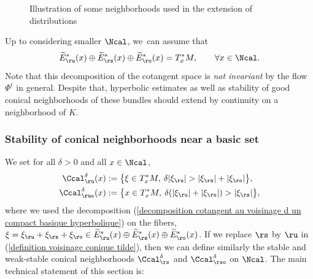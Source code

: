 \begin{figure}[t]
\centering
\def\svgscale{0.5}

\caption{Illustration of some neighborhoods used in the extension of distributions}
\label{fig: neighborhoods extension of distributions}
\end{figure}

Up to considering smaller $\Ncal$, we~can assume that
\begin{equation}\label{decomposition cotangent au voisinage d un compact basique hyperbolique}
\widetilde{E}_{\ru}^*(x) \oplus \widetilde{E}_{\rs}^*(x) \oplus \widetilde{E}_\ro^*(x) = T_x^* M, \qquad \forall x \in \Ncal.
\end{equation}
Note that this decomposition of the cotangent space is \emph{not invariant} by the flow~$\Phi^t$ in general. Despite that, hyperbolic estimates as well as stability of good conical neighborhoods of these bundles should extend by continuity on a neighborhood of $K$.

\subsubsection{Stability of conical neighborhoods near a basic set}

We set for all $\delta > 0$ and all $x \in \Ncal$,
\begin{equation}\label{definition voisinage conique tilde}
\begin{split}
\Ccal_{\ru}^{\delta} (x) &:= \bigl\{ \xi \in T_{x}^* M, \: \delta |\xi_\ru| > |\xi_\rs| + |\xi_\ro| \bigr\}, \\
\Ccal_{\ruo}^{\delta} (x) &:= \bigl\{ x \in T_{x}^* M, \: \delta (|\xi_\ru| + |\xi_\ro|) > |\xi_\rs| \bigr\},
\end{split}
\end{equation}
where we used the decomposition (\ref{decomposition cotangent au voisinage d un compact basique hyperbolique}) on the fibers, \ie $\xi = \xi_{\ru} + \xi_{\rs}+ \xi_{\ro} \in \widetilde{E}_{\ru}^*(x) \oplus \widetilde{E}_{\rs}^*(x) \oplus \widetilde{E}_\ro^*(x)$. If we replace $\rs$ by $\ru$ in (\ref{definition voisinage conique tilde}), then we can define similarly the stable and weak-stable conical neighborhoods $\Ccal_{\rs}^{\delta}$ and $\Ccal_{\rso}^{\delta}$ on $\Ncal$. The main technical statement of this section is:

